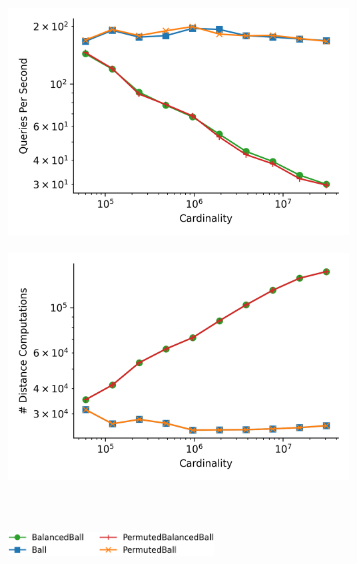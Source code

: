 \begin{figure}
\begin{subfigure}[b]{0.5\textwidth}
        \includegraphics[width=0.99\textwidth]{images/distance_counts/fashion-mnist_KnnDepthFirst_10_throughput.png}
        \label{fig:results:silva-counts-throughput}
    \end{subfigure}%
    \begin{subfigure}[b]{0.5\textwidth}
        \includegraphics[width=0.99\textwidth]{images/distance_counts/fashion-mnist_KnnDepthFirst_10_counts.png}
        \label{fig:results:radioml-counts-counts}
    \end{subfigure}%
    \\
    \begin{subfigure}[b]{0.94\textwidth}
        \centering
        \includegraphics[width=0.6\textwidth]{images/distance_counts/legend.png}

\end{subfigure}
\end{figure}
